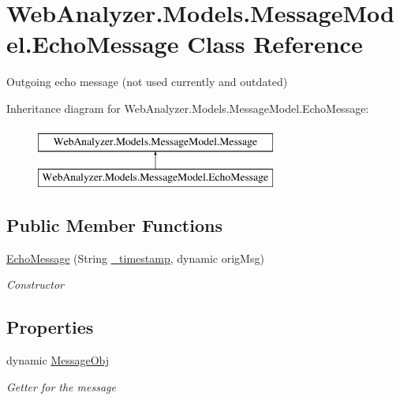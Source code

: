 \hypertarget{class_web_analyzer_1_1_models_1_1_message_model_1_1_echo_message}{}\section{Web\+Analyzer.\+Models.\+Message\+Model.\+Echo\+Message Class Reference}
\label{class_web_analyzer_1_1_models_1_1_message_model_1_1_echo_message}


Outgoing echo message (not used currently and outdated)  


Inheritance diagram for Web\+Analyzer.\+Models.\+Message\+Model.\+Echo\+Message\+:\begin{figure}[H]
\begin{center}
\leavevmode
\includegraphics[height=2.000000cm]{class_web_analyzer_1_1_models_1_1_message_model_1_1_echo_message}
\end{center}
\end{figure}
\subsection*{Public Member Functions}
\begin{DoxyCompactItemize}
\item 
\hyperlink{class_web_analyzer_1_1_models_1_1_message_model_1_1_echo_message_a17c4657c77bf651848d58fdca8c4998a}{Echo\+Message} (String \hyperlink{class_web_analyzer_1_1_models_1_1_message_model_1_1_message_ae1e243f35e213e08ec2bdc54f64b0d2e}{\+\_\+timestamp}, dynamic orig\+Msg)
\begin{DoxyCompactList}\small\item\em Constructor \end{DoxyCompactList}\end{DoxyCompactItemize}
\subsection*{Properties}
\begin{DoxyCompactItemize}
\item 
dynamic \hyperlink{class_web_analyzer_1_1_models_1_1_message_model_1_1_echo_message_a547379308602e0e2a8af2a9790d3e9a4}{Message\+Obj}
\begin{DoxyCompactList}\small\item\em Getter for the message \end{DoxyCompactList}\end{DoxyCompactItemize}
